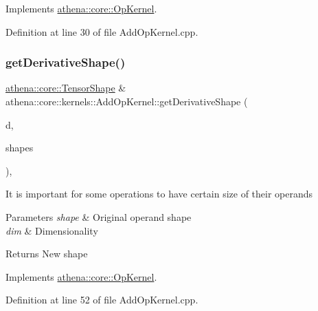 Implements \mbox{\hyperlink{classathena_1_1core_1_1_op_kernel_ad500db1afc5a7c10acff8ecb8f1bee4d}{athena\+::core\+::\+Op\+Kernel}}.



Definition at line 30 of file Add\+Op\+Kernel.\+cpp.

\mbox{\label{classathena_1_1core_1_1kernels_1_1_add_op_kernel_a240d13047b8fd7676bf1f9d2bc94298f}} 
\subsubsection{\texorpdfstring{get\+Derivative\+Shape()}{getDerivativeShape()}}
{\footnotesize\ttfamily \mbox{\hyperlink{classathena_1_1core_1_1_tensor_shape}{athena\+::core\+::\+Tensor\+Shape}} \& athena\+::core\+::kernels\+::\+Add\+Op\+Kernel\+::get\+Derivative\+Shape (\begin{DoxyParamCaption}\item[{int}]{d,  }\item[{std\+::vector$<$ \mbox{\hyperlink{classathena_1_1core_1_1_tensor_shape}{athena\+::core\+::\+Tensor\+Shape}} $>$ \&}]{shapes }\end{DoxyParamCaption})\hspace{0.3cm}{\ttfamily [override]}, {\ttfamily [virtual]}}

It is important for some operations to have certain size of their operands 
\begin{DoxyParams}{Parameters}
{\em shape} & Original operand shape \\
\hline
{\em dim} & Dimensionality \\
\hline
\end{DoxyParams}
\begin{DoxyReturn}{Returns}
New shape 
\end{DoxyReturn}


Implements \mbox{\hyperlink{classathena_1_1core_1_1_op_kernel_ad95af6dd184ce7ee9182ec7ca54b6c4d}{athena\+::core\+::\+Op\+Kernel}}.



Definition at line 52 of file Add\+Op\+Kernel.\+cpp.

\mbox{\label{classathena_1_1core_1_1kernels_1_1_add_op_kernel_a296a0c69a7b906037324cce2b64827e1}} 
